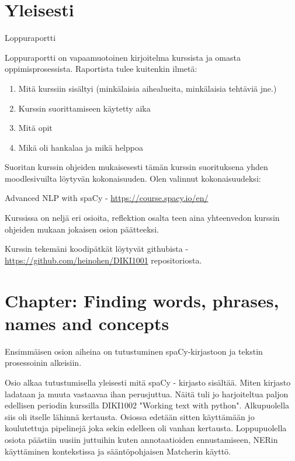 \documentclass{article}
\begin{document}
\pagestyle{fancy}
\fancyhead{} %



 \section*{Yleisesti}

 Loppuraportti

Loppuraportti on vapaamuotoinen kirjoitelma kurssista ja omasta oppimisprosessista. Raportista tulee kuitenkin ilmetä:
\begin{enumerate}
    \item     Mitä kurssiin sisältyi (minkälaisia aihealueita, minkälaisia tehtäviä jne.)
    \item     Kurssin suorittamiseen käytetty aika 
    \item       Mitä opit
    \item     Mikä oli hankalaa ja mikä helppoa
\end{enumerate}

    Suoritan kurssin ohjeiden mukaisesesti tämän kurssin suorituksena yhden moodlesivuilta löytyvän kokonaisuuden. Olen valinnut kokonaisuudeksi: 

    Advanced NLP with spaCy - \url{https://course.spacy.io/en/}

    Kurssissa on neljä eri osioita, reflektion osalta teen aina yhteenvedon kurssin ohjeiden mukaan jokaisen osion päätteeksi.

    
    Kurssin tekemäni koodipätkät löytyvät githubista - \url{https://github.com/heinohen/DIKI1001} repositoriosta.
\section{Chapter: Finding words, phrases, names and concepts}

Ensimmäisen osion aiheina on tutustuminen spaCy-kirjastoon ja tekstin prosessoinin alkeisiin.

Osio alkaa tutustumisella yleisesti mitä spaCy - kirjasto sisältää. Miten kirjasto ladataan ja muuta vastaavaa ihan perusjuttua. Näitä tuli jo harjoiteltua paljon edellisen periodin kurssilla 
DIKI1002 "Working text with python". Alkupuolella siis oli itselle lähinnä kertausta. Osiossa edetään sitten käyttämään jo koulutettuja pipelinejä joka sekin edelleen oli vanhan kertausta. Loppupuolella osiota päästiin uusiin juttuihin kuten annotaatioiden ennustamiseen, NERin käyttäminen kontekstissa ja sääntöpohjaisen Matcherin käyttö.
\end{document}
